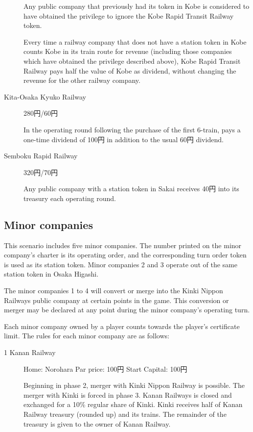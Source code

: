 \documentclass{article}
\begin{document}
\begin{CJK}{UTF8}{min}
\begin{multicols}{2}
\begin{description}
  Any public company that previously had its token in Kobe is
  considered to have obtained the privilege to ignore the Kobe Rapid
  Transit Railway token.

  Every time a railway company that does not have a station token in
  Kobe counts Kobe in its train route for revenue (including those
  companies which have obtained the privilege described above), Kobe
  Rapid Transit Railway pays half the value of Kobe as dividend,
  without changing the revenue for the other railway company.

\item[Kita-Osaka Kyuko Railway] \hfill 280円/60円

  In the operating round following the purchase of the first 6-train,
  pays a one-time dividend of 100円 in addition to the usual 60円 dividend.

\item[Semboku Rapid Railway] \hfill 320円/70円

  Any public company with a station token in Sakai receives 40円
  into its treasury each operating round.
\end{description}

\subsection{Minor companies}
\label{sec:minor-companies}

This scenario includes five minor companies. The number printed on the
minor company's charter is its operating order, and the corresponding
turn order token is used as its station token. Minor companies 2 and 3
operate out of the same station token in Osaka Higashi.

The minor companies 1 to 4 will convert or merge into the Kinki Nippon
Railways public company at certain points in the game. This conversion
or merger may be declared at any point during the minor company's
operating turn.

Each minor company owned by a player counts towards the player's
certificate limit. The rules for each minor company are as follows:

\begin{description}

\item[1 Kanan Railway] \hfill

Home: Norohara \hfill Par price: 100円 \hfill Start Capital: 100円

Beginning in phase 2, merger with Kinki Nippon Railway is
possible. The merger with Kinki is forced in phase 3. Kanan Railways
is closed and exchanged for a 10\% regular share of Kinki. Kinki
receives half of Kanan Railway treasury (rounded up) and its
trains. The remainder of the treasury is given to the owner of Kanan
Railway.


\end{description}
\end{multicols}
\end{CJK}
\end{document}
